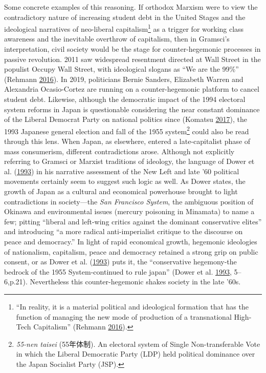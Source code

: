 \documentclass[10pt,british,A4paper,,openany]{memoir}
\begin{document}
Some concrete examples of this reasoning. If orthodox Marxism were to
view the contradictory nature of increasing student debt in the United
Stages and the ideological narratives of neo-liberal
capitalism\footnote{``In reality, it is a material political and
  ideological formation that has the function of managing the new mode
  of production of a transnational High-Tech Capitalism'' (Rehmann
  \protect\hyperlink{ref-rehmann_bernie_2016}{2016}).} as a trigger for
working class awareness and the inevitable overthrow of capitalism, then
in Gramsci's interpretation, civil society would be the stage for
counter-hegemonic processes in passive revolution. 2011 saw widespread
resentment directed at Wall Street in the populist Occupy Wall Street,
with ideological slogans as ``We are the 99\%'' (Rehmann
\protect\hyperlink{ref-rehmann_bernie_2016}{2016}). In 2019, politicians
Bernie Sanders, Elizabeth Warren and Alexandria Ocasio-Cortez are
running on a counter-hegemonic platform to cancel student debt.
Likewise, although the democratic impact of the 1994 electoral system
reforms in Japan is questionable considering the near constant dominance
of the Liberal Democrat Party on national politics since (Komatsu
\protect\hyperlink{ref-komatsu_first_2017}{2017}), the 1993 Japanese
general election and fall of the 1955 system\footnote{\emph{55-nen
  taisei} (55年体制). An electoral system of Single Non-transferable
  Vote in which the Liberal Democratic Party (LDP) held political
  dominance over the Japan Socialist Party (JSP).} could also be read
through this lens. When Japan, as elsewhere, entered a late-capitalist
phase of mass consumerism, different contradictions arose. Although not
explicitly referring to Gramsci or Marxist traditions of ideology, the
language of Dower et al.
(\protect\hyperlink{ref-dower_peace_1993}{1993}) in his narrative
assessment of the New Left and late '60 political movements certainly
seem to suggest such logic as well. As Dower states, the growth of Japan
as a cultural and economical powerhouse brought to light contradictions
in society---the \emph{San Francisco System}, the ambiguous position of
Okinawa and environmental issues (mercury poisoning in Minamata) to name
a few; pitting ``liberal and left-wing critics against the dominant
conservative elites'' and introducing ``a more radical anti-imperialist
critique to the discourse on peace and democracy.'' In light of rapid
economical growth, hegemonic ideologies of nationalism, capitalism,
peace and democracy retained a strong grip on public consent, or as
Dower et al. (\protect\hyperlink{ref-dower_peace_1993}{1993}) puts it,
the ``conservative hegemony-the bedrock of the 1955 System-continued to
rule japan'' (Dower et al.
\protect\hyperlink{ref-dower_peace_1993}{1993}, 5--6,p.21). Nevertheless
this counter-hegemonic shakes society in the late '60s.
\end{document}
